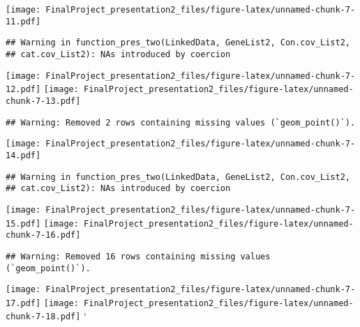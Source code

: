 \documentclass[
]{article}
\begin{document}
\texttt{[image: FinalProject\_presentation2\_files/figure-latex/unnamed-chunk-7-11.pdf]}

\begin{verbatim}
## Warning in function_pres_two(LinkedData, GeneList2, Con.cov_List2,
## cat.cov_List2): NAs introduced by coercion
\end{verbatim}

\texttt{[image: FinalProject\_presentation2\_files/figure-latex/unnamed-chunk-7-12.pdf]}
\texttt{[image: FinalProject\_presentation2\_files/figure-latex/unnamed-chunk-7-13.pdf]}

\begin{verbatim}
## Warning: Removed 2 rows containing missing values (`geom_point()`).
\end{verbatim}

\texttt{[image: FinalProject\_presentation2\_files/figure-latex/unnamed-chunk-7-14.pdf]}

\begin{verbatim}
## Warning in function_pres_two(LinkedData, GeneList2, Con.cov_List2,
## cat.cov_List2): NAs introduced by coercion
\end{verbatim}

\texttt{[image: FinalProject\_presentation2\_files/figure-latex/unnamed-chunk-7-15.pdf]}
\texttt{[image: FinalProject\_presentation2\_files/figure-latex/unnamed-chunk-7-16.pdf]}

\begin{verbatim}
## Warning: Removed 16 rows containing missing values (`geom_point()`).
\end{verbatim}

\texttt{[image: FinalProject\_presentation2\_files/figure-latex/unnamed-chunk-7-17.pdf]}
\texttt{[image: FinalProject\_presentation2\_files/figure-latex/unnamed-chunk-7-18.pdf]}
`
\end{document}
